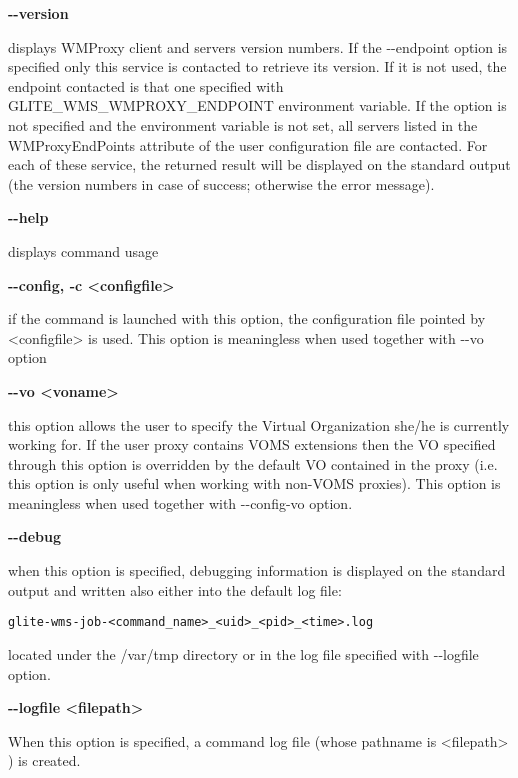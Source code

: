 \textbf{-{}-version}

displays WMProxy client and servers version numbers.
If the -{}-endpoint option is specified only this service is contacted to retrieve its version. If it is not used, the endpoint contacted is that one specified with GLITE\_WMS\_WMPROXY\_ENDPOINT environment variable. If the option is not specified and the environment variable is not set, all servers listed in the WMProxyEndPoints attribute of the user configuration file are contacted. For each of these service, the returned result will be displayed on the standard output (the version numbers in case of success; otherwise the error message).




\textbf{-{}-help}

displays command usage




\textbf{-{}-config, -c <configfile>}

if the command is launched with this option, the configuration file pointed by <configfile> is used. This option is meaningless when used together with -{}-vo option




\textbf{-{}-vo <voname>}

this option allows the user to specify the Virtual Organization she/he is currently working for.
If the user proxy contains VOMS extensions then the VO specified through this option is overridden by the
default VO contained in the proxy (i.e. this option is only useful when working with non-VOMS proxies).
This option is meaningless when used together with -{}-config-vo option.




\textbf{-{}-debug}

when this option is specified, debugging information is displayed on the standard output and written also either into the default log file:


\begin{verbatim}
glite-wms-job-<command_name>_<uid>_<pid>_<time>.log
\end{verbatim}

located under the /var/tmp  directory or in the log file specified with -{}-logfile option.




\textbf{-{}-logfile <filepath>}

When this option is specified, a command log file (whose pathname is <filepath> ) is created.



